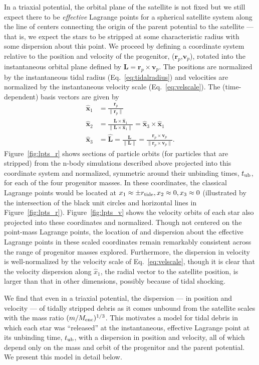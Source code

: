 \documentclass[letterpaper,12pt,preprint]{aastex}
\newcommand{\rtide}{r_{\rm tide}}
\newcommand{\bs}{\boldsymbol}
\newcommand{\tub}{t_{\rm ub}}
\begin{document}
In a triaxial potential, the orbital plane of the satellite is not fixed but we still expect there to be \emph{effective} Lagrange points for a spherical satellite system along the line of centers connecting the origin of the parent potential to the satellite --- that is, we expect the stars to be stripped at some characteristic radius with some dispersion about this point. We proceed by defining a coordinate system relative to the position and velocity of the progenitor, ($\bs{r}_p$,$\bs{v}_p$), rotated into the instantaneous orbital plane defined by $\bs{L} = \bs{r}_p \times \bs{v}_p$. The positions are normalized by the instantaneous tidal radius (Eq.~\ref{eq:tidalradius}) and velocities are normalized by the instantaneous velocity scale (Eq.~\ref{eq:velscale}). 
The (time-dependent) basis vectors are given by
\begin{align}
	\hat{\bs{x}}_1 &= \frac{\bs{r}_p}{\|\bs{r}_p\|}\label{eq:x1}\\
	\hat{\bs{x}}_2 &= \frac{\bs{L} \times \hat{\bs{x}}_1}{\|\bs{L} \times \hat{\bs{x}}_1\|} = \hat{\bs{x}}_3 \times \hat{\bs{x}}_1\\
	\hat{\bs{x}}_3 &= \hat{\bs{L}} = \frac{\bs{L}}{\|\bs{L}\|} = \frac{\bs{r}_p \times \bs{v}_p}{\|\bs{r}_p \times \bs{v}_p\|}\label{eq:x3}.
\end{align}
Figure~\ref{fig:lpts_r} shows sections of particle orbits (for particles that are stripped) from the n-body simulations described above projected into this coordinate system and normalized, symmetric around their unbinding times, $\tub$, for each of the four progenitor masses. In these coordinates, the classical Lagrange points would be located at $x_1\approx\pm\rtide,x_2\approx0,x_3\approx0$ (illustrated by the intersection of the black unit circles and horizontal lines in Figure~\ref{fig:lpts_r}). Figure~\ref{fig:lpts_v} shows the velocity orbits of each star also projected into these coordinates and normalized. Though not centered on the point-mass Lagrange points, the location of and dispersion about the effective Lagrange points in these scaled coordinates remain remarkably consistent across the range of progenitor masses explored. Furthermore, the dispersion in velocity is well-normalized by the velocity scale of Eq.~\ref{eq:velscale}, though it is clear that the velocity dispersion along $\hat{x}_1$, the radial vector to the satellite position, is larger than that in other dimensions, possibly because of tidal shocking. 

We find that even in a triaxial potential, the dispersion --- in position and velocity --- of tidally stripped debris as it comes unbound from the satellite scales with the mass ratio $(m / M_{\rm enc})^{1/3}$. This motivates a model for tidal debris in which each star was ``released'' at the instantaneous, effective Lagrange point at its unbinding time, $\tub$, with a dispersion in position and velocity, all of which depend only on the mass and orbit of the progenitor and the parent potential. We present this model in detail below.
\end{document}
